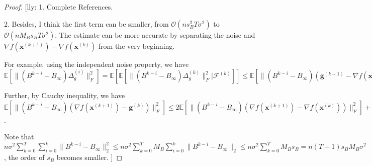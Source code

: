 \documentclass{article}
\newcommand{\vg}{{\mathbf{g}}}
\newcommand{\vx}{{\mathbf{x}}}
\newcommand{\cF}{{\mathcal{F}}}
\newcommand{\cO}{{\mathcal{O}}}
\newcommand{\EE}[1]{\mathbb{E}\left[#1\right]}
\newcommand{\norm}[1]{\| #1 \|}
\newcommand{\lly}[1]{{\color{red}[lly: #1]}}
\begin{document}
\begin{proof}
\lly{
1. Complete References. 

2. Besides, I think the first term can be smaller, from $\cO(ns_B^2T\sigma^2)$ to $\cO(nM_Bs_BT\sigma^2)$. The estimate can be more accurate by separating the noise and $\nabla f(\vx^{(k+1)})-\nabla f(\vx^{(k)})$ from the very beginning. 

For example, using the independent noise property, we have $\EE{\norm{(B^{k-i}-B_{\infty})\Delta_g^{(i)}}_F^2}= \EE{\EE{\norm{(B^{k-i}-B_\infty)\Delta_g^{(k)}}_F^2|\cF^{(k)}}}\le \EE{\norm{(B^{k-i}-B_\infty)(\vg^{(k+1)}-\nabla f(\vx^{(k)}))}_F^2+\EE{\norm{(B^{k-i}-B_{\infty})(\nabla f(\vx^{(k+1)})-\vg^{(k)})}_F^2|\cF^{(k)}}}\le n\sigma^2\norm{B^{k-i}-B_\infty}_2^2+\EE{\norm{(B^{k-i}-B_{\infty})(\nabla f(\vx^{(k+1)})-\vg^{(k)})}_F^2} $ 

Further, by Cauchy inequality, we have 
$\EE{\norm{(B^{k-i}-B_{\infty})(\nabla f(\vx^{(k+1)})-\vg^{(k)})}_F^2} \le 2\EE{\norm{(B^{k-i}-B_{\infty})(\nabla f(\vx^{(k+1)})-\nabla f(\vx^{(k)}))}_F^2}+2n\sigma^2\norm{B^{k-i}-B_\infty}_2^2$.

Note that $n\sigma^2 \sum_{k=0}^T\sum_{i=0}^k \norm{B^{k-i}-B_\infty}_2^2\le n\sigma^2 \sum_{k=0}^T M_B\sum_{i=0}^k\norm{B^{k-i}-B_\infty}_2\le n\sigma^2\sum_{k=0}^T M_Bs_B=n(T+1)s_BM_B\sigma^2$, the order of $s_B$ becomes smaller.
}


\end{proof}
\end{document}
